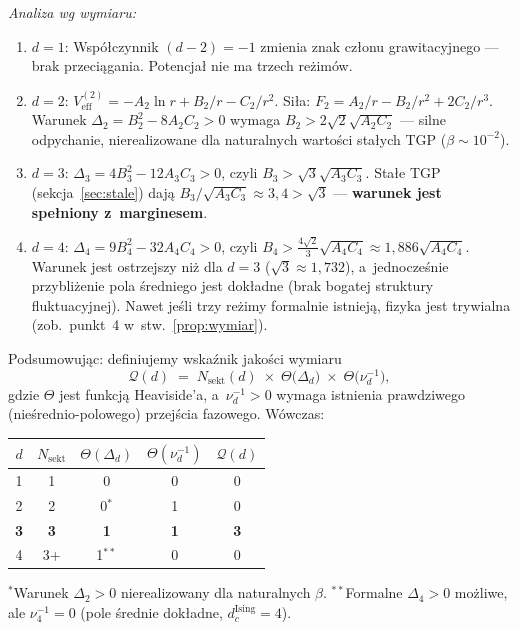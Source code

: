 \begin{remark}[Wzmocnienie ilo\'sciowe argumentu za $d = 3$]
\emph{Analiza wg wymiaru:}
\begin{enumerate}[nosep]
  \item \textbf{$d = 1$}: Wsp\'o\l{}czynnik $(d{-}2) = -1$
        zmienia znak cz\l{}onu grawitacyjnego --- brak
        przeci\k{a}gania. Potencja\l{} nie ma trzech re\.zim\'ow.
  \item \textbf{$d = 2$}: $V_{\mathrm{eff}}^{(2)} =
        -A_2\ln r + B_2/r - C_2/r^2$. Si\l{}a:
        $F_2 = A_2/r - B_2/r^2 + 2C_2/r^3$. Warunek
        $\Delta_2 = B_2^2 - 8A_2 C_2 > 0$ wymaga
        $B_2 > 2\sqrt{2}\sqrt{A_2 C_2}$ --- silne odpychanie,
        nierealizowane dla naturalnych warto\'sci sta\l{}ych TGP
        ($\beta \sim 10^{-2}$).
  \item \textbf{$d = 3$}: $\Delta_3 = 4B_3^2 - 12A_3 C_3 > 0$,
        czyli $B_3 > \sqrt{3}\sqrt{A_3 C_3}$. Sta\l{}e TGP
        (sekcja~\ref{sec:stale}) daj\k{a}
        $B_3 / \sqrt{A_3 C_3} \approx 3{,}4 > \sqrt{3}$ ---
        \textbf{warunek jest spe\l{}niony z~marginesem}.
  \item \textbf{$d = 4$}: $\Delta_4 = 9B_4^2 - 32 A_4 C_4 > 0$,
        czyli $B_4 > \tfrac{4\sqrt{2}}{3}\sqrt{A_4 C_4}
        \approx 1{,}886\sqrt{A_4 C_4}$. Warunek jest ostrzejszy
        ni\.z dla $d = 3$ ($\sqrt{3} \approx 1{,}732$), a~jednocze\'snie
        przybli\.zenie pola \'sredniego jest dok\l{}adne
        (brak bogatej struktury fluktuacyjnej). Nawet je\'sli
        trzy re\.zimy formalnie istniej\k{a}, fizyka jest
        trywialna (zob.\ punkt~4 w~stw.~\ref{prop:wymiar}).
\end{enumerate}

\smallskip
Podsumowuj\k{a}c: definiujemy wska\'znik jako\'sci wymiaru
\begin{equation}\label{eq:Q-d}
  \mathcal{Q}(d) \;=\;
  N_{\mathrm{sekt}}(d) \;\times\;
  \Theta\bigl(\Delta_d\bigr) \;\times\;
  \Theta\bigl(\nu_d^{-1}\bigr),
\end{equation}
gdzie $\Theta$ jest funkcj\k{a} Heaviside'a, a~$\nu_d^{-1} > 0$
wymaga istnienia prawdziwego (nie\'srednio-polowego)
przej\'scia fazowego. W\'owczas:
\begin{center}
\renewcommand{\arraystretch}{1.2}
\begin{tabular}{c|ccc|c}
\toprule
$d$ & $N_{\mathrm{sekt}}$ &
  $\Theta(\Delta_d)$ & $\Theta(\nu_d^{-1})$ &
  $\mathcal{Q}(d)$ \\
\midrule
1 & 1 & 0 & 0 & 0 \\
2 & 2 & 0$^{*}$ & 1 & 0 \\
\textbf{3} & \textbf{3} & \textbf{1} & \textbf{1}
  & \textbf{3} \\
4 & 3+ & 1$^{**}$ & 0 & 0 \\
\bottomrule
\end{tabular}
\end{center}
{\small ${}^{*}$Warunek $\Delta_2 > 0$ nierealizowany
dla naturalnych $\beta$.
${}^{**}$Formalne $\Delta_4 > 0$ mo\.zliwe, ale
$\nu_4^{-1} = 0$ (pole \'srednie dok\l{}adne,
$d_c^{\mathrm{Ising}} = 4$).}


\end{remark}
